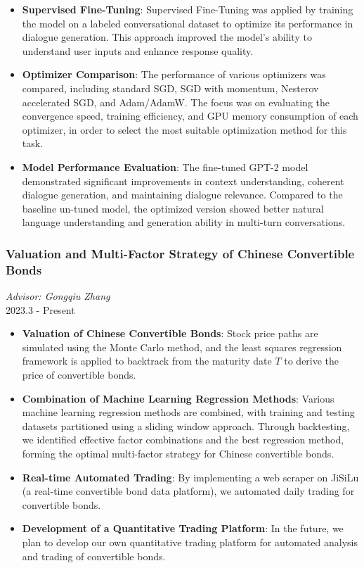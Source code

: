 \documentclass[twocolumn]{article}
\begin{document}
\begin{itemize}
    \item \textbf{Supervised Fine-Tuning}: Supervised Fine-Tuning  was applied by training the model on a labeled conversational dataset to optimize its performance in dialogue generation. This approach improved the model’s ability to understand user inputs and enhance response quality.

    \item \textbf{Optimizer Comparison}: The performance of various optimizers was compared, including standard SGD, SGD with momentum, Nesterov accelerated SGD, and Adam/AdamW. The focus was on evaluating the convergence speed, training efficiency, and GPU memory consumption of each optimizer, in order to select the most suitable optimization method for this task.

    \item \textbf{Model Performance Evaluation}: The fine-tuned GPT-2 model demonstrated significant improvements in context understanding, coherent dialogue generation, and maintaining dialogue relevance. Compared to the baseline un-tuned model, the optimized version showed better natural language understanding and generation ability in multi-turn conversations.
\end{itemize}



\subsubsection{Valuation and Multi-Factor Strategy of Chinese Convertible Bonds}
\textit{Advisor: Gongqiu Zhang} \\
2023.3 - Present \\

\begin{itemize}
    \item \textbf{Valuation of Chinese Convertible Bonds}: Stock price paths are simulated using the Monte Carlo method, and the least squares regression framework is applied to backtrack from the maturity date $T$ to derive the price of convertible bonds.
    \item \textbf{Combination of Machine Learning Regression Methods}: Various machine learning regression methods are combined, with training and testing datasets partitioned using a sliding window approach. Through backtesting, we identified effective factor combinations and the best regression method, forming the optimal multi-factor strategy for Chinese convertible bonds.
    \item \textbf{Real-time Automated Trading}: By implementing a web scraper on JiSiLu (a real-time convertible bond data platform), we automated daily trading for convertible bonds.
    \item \textbf{Development of a Quantitative Trading Platform}: In the future, we plan to develop our own quantitative trading platform for automated analysis and trading of convertible bonds.
\end{itemize}
\end{document}
